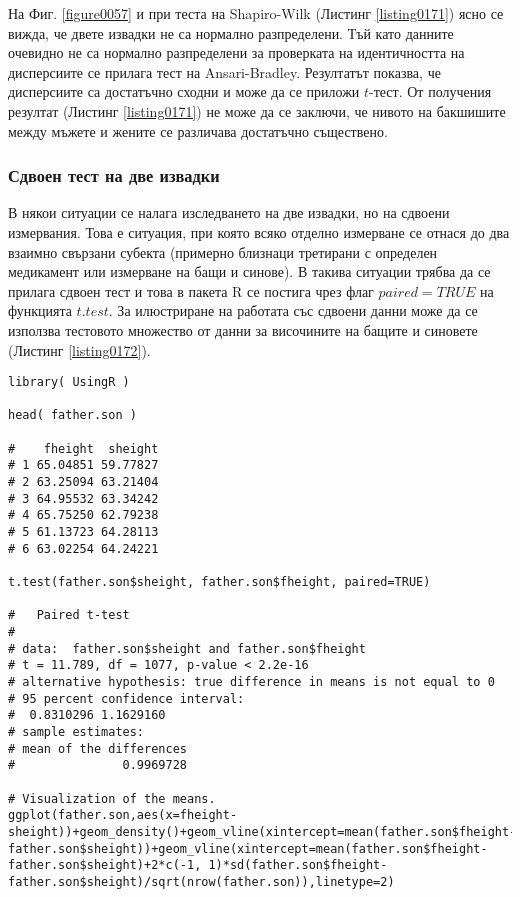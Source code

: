 На Фиг. \ref{figure0057} и при теста на Shapiro-Wilk (Листинг \ref{listing0171}) ясно се вижда, че двете извадки не са нормално разпределени. Тъй като данните очевидно не са нормално разпределени за проверката на идентичността на дисперсиите се прилага тест на Ansari-Bradley. Резултатът показва, че дисперсиите са достатъчно сходни и може да се приложи $t$-тест. От получения резултат (Листинг \ref{listing0171}) не може да се заключи, че нивото на бакшишите между мъжете и жените се различава достатъчно съществено. 

\subsubsection{Сдвоен тест на две извадки}

В някои ситуации се налага изследването на две извадки, но на сдвоени измервания. Това е ситуация, при която всяко отделно измерване се отнася до два взаимно свързани субекта (примерно близнаци третирани с определен медикамент или измерване на бащи и синове). В такива ситуации трябва да се прилага сдвоен тест и това в пакета R се постига чрез флаг $paired=TRUE$ на функцията $t.test$. За илюстриране на работата със сдвоени данни може да се използва тестовото множество от данни за височините на бащите и синовете (Листинг \ref{listing0172}).

\begin{lstlisting}[caption=Т-тест на сдвоени данни, label=listing0172]
library( UsingR )

head( father.son )

#    fheight  sheight
# 1 65.04851 59.77827
# 2 63.25094 63.21404
# 3 64.95532 63.34242
# 4 65.75250 62.79238
# 5 61.13723 64.28113
# 6 63.02254 64.24221

t.test(father.son$sheight, father.son$fheight, paired=TRUE)

# 	Paired t-test
# 
# data:  father.son$sheight and father.son$fheight
# t = 11.789, df = 1077, p-value < 2.2e-16
# alternative hypothesis: true difference in means is not equal to 0
# 95 percent confidence interval:
#  0.8310296 1.1629160
# sample estimates:
# mean of the differences 
#               0.9969728 

# Visualization of the means.
ggplot(father.son,aes(x=fheight-sheight))+geom_density()+geom_vline(xintercept=mean(father.son$fheight-father.son$sheight))+geom_vline(xintercept=mean(father.son$fheight-father.son$sheight)+2*c(-1, 1)*sd(father.son$fheight-father.son$sheight)/sqrt(nrow(father.son)),linetype=2)
\end{lstlisting}

